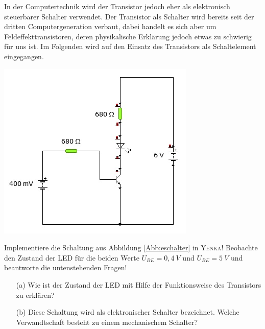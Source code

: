 In der Computertechnik wird der Transistor jedoch eher als elektronisch steuerbarer Schalter verwendet. Der Transistor als Schalter wird bereits seit der dritten Computergeneration verbaut, dabei handelt es sich aber um Feldeffekttransistoren, deren physikalische Erklärung jedoch etwas zu schwierig für uns ist.
Im Folgenden wird auf den Einsatz des Transistors als Schaltelement eingegangen. 



\begin{Aufgabe}
\hfill \par
\vspace*{-.7cm}
\begin{center}
\includegraphics[scale=.9]{pics/eschalter}
\label{Abb:eschalter}
\end{center}

Implementiere die Schaltung aus Abbildung \ref{Abb:eschalter} 
in \textsc{Yenka}!
Beobachte den Zustand der LED für die beiden Werte $U_{BE}=0,4 ~V$ und $U_{BE}=5~V$ und beantworte die untenstehenden Fragen!
\begin{itemize}
\item[(a)] Wie ist der Zustand der LED mit Hilfe der Funktionsweise des Transistors zu erklären?
\item[(b)] Diese Schaltung wird als elektronischer Schalter bezeichnet. Welche Verwandtschaft besteht zu einem mechanischem Schalter?
\end{itemize}
\end{Aufgabe}

